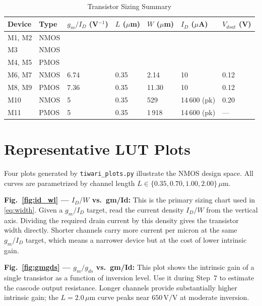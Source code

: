 \documentclass[conference]{IEEEtran}
\begin{document}
\begin{table}[htbp]
\caption{Transistor Sizing Summary}
\begin{center}
\begin{tabular}{lllllll}
\toprule
\textbf{Device} & \textbf{Type} & \textbf{$g_m/I_D$ (V$^{-1}$)} & \textbf{$L$ ($\mu$m)} & \textbf{$W$ ($\mu$m)} & \textbf{$I_D$ ($\mu$A)} & \textbf{$V_{dsat}$ (V)} \\
\midrule
M1, M2  & NMOS &      &      &           &        &      \\
M3      & NMOS &      &      &           &        &      \\
M4, M5  & PMOS &      &      &           &        &      \\
M6, M7  & NMOS & 6.74 & 0.35 &  2.14     & 10     & 0.12 \\
M8, M9  & PMOS & 7.36 & 0.35 & 11.30     & 10     & 0.12 \\
M10     & NMOS & 5    & 0.35 &    529    & 14\,600 (pk) & 0.20 \\
M11     & PMOS & 5    & 0.35 & 1\,918    & 14\,600 (pk) & ---  \\
\bottomrule
\end{tabular}
\label{tab:design}
\end{center}
\end{table}

\section{Representative LUT Plots}
\label{sec:plots}

Four plots generated by \texttt{tiwari\_plots.py} illustrate the NMOS
design space.  All curves are parametrized by channel length
$L \in \{0.35, 0.70, 1.00, 2.00\}\,\mu\text{m}$.

\textbf{Fig.~\ref{fig:id_wl} --- $I_D/W$ vs.\ gm/Id:} This is the
primary sizing chart used in \eqref{eq:width}.  Given a $g_m/I_D$ target,
read the current density $I_D/W$ from the vertical axis.  Dividing the
required drain current by this density gives the transistor width directly.
Shorter channels carry more current per micron at the same $g_m/I_D$ target,
which means a narrower device but at the cost of lower intrinsic gain.

\textbf{Fig.~\ref{fig:gmgds} --- $g_m/g_{ds}$ vs.\ gm/Id:} This plot shows
the intrinsic gain of a single transistor as a function of inversion level.
Use it during Step~7 to estimate the cascode output resistance.  Longer
channels provide substantially higher intrinsic gain; the $L = 2.0\,\mu\text{m}$
curve peaks near $650\,\text{V/V}$ at moderate inversion.
\end{document}
